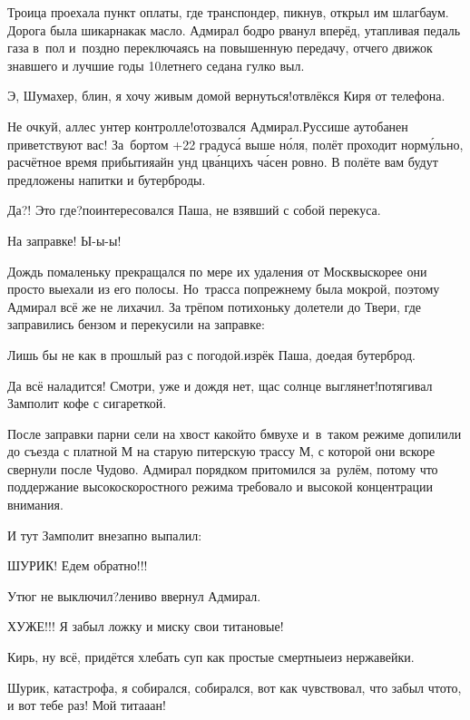 Троица проехала пункт оплаты, где транспондер, пикнув, открыл им шлагбаум. Дорога была шикарна\mdash как масло. Адмирал бодро рванул вперёд, утапливая педаль газа в~пол и~поздно переключаясь на повышенную передачу, отчего движок знавшего и лучшие годы 10\sdash летнего седана гулко выл. 

\diagdash Э, Шумахер, блин, я хочу живым домой вернуться!\mdash отвлёкся Киря от телефона.

\diagdash Не очкуй, аллес унтер контролле!\mdash отозвался Адмирал.\mdash Руссише аутобанен приветствуют вас! За~бортом +22 градус\'{а} выше н\'{о}ля, полёт проходит норм\'{у}льно, расчётное время прибытия\mdash айн унд цв\'{а}нцихъ ч\'{а}сен ровно. В полёте вам будут предложены напитки и бутерброды.

\diagdash Да?! Это где?\mdash поинтересовался Паша, не взявший с собой перекуса.

\diagdash На заправке! Ы-ы-ы!

Дождь помаленьку прекращался по мере их удаления от Москвы\mdash скорее они просто выехали из его полосы. Но~трасса по\sdash прежнему была мокрой, поэтому Адмирал всё же не лихачил. За трёпом потихоньку долетели до Твери, где заправились бензом и перекусили на заправке:

\diagdash Лишь бы не как в прошлый раз с погодой.\mdash изрёк Паша, доедая бутерброд.

\diagdash Да всё наладится! Смотри, уже и дождя нет, щас солнце выглянет!\mdash потягивал Замполит кофе с сигареткой.

После заправки парни сели на хвост какой\sdash то бмв\sdash ухе и~в~таком режиме допилили до съезда с платной М на старую питерскую трассу М, с которой они вскоре свернули после Чудово. Адмирал порядком притомился за~рулём, потому что поддержание высокоскоростного режима требовало и высокой концентрации внимания. 

И тут Замполит внезапно выпалил:

\diagdash ШУРИК! Едем обратно!!!

\diagdash Утюг не выключил?\mdash лениво ввернул Адмирал.

\diagdash ХУЖЕ!!! Я забыл ложку и миску свои титановые!

\diagdash Кирь, ну всё, придётся хлебать суп как простые смертные\mdash из нержавейки.

\diagdash Шурик, катастрофа, я собирался, собирался, вот как чувствовал, что забыл что\sdash то, и вот тебе раз! Мой тита\sdash а\sdash ан!

